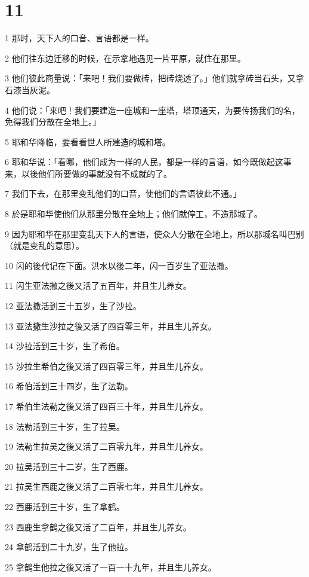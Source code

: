 \chapter{11}

\par 1 那时，天下人的口音、言语都是一样。
\par 2 他们往东边迁移的时候，在示拿地遇见一片平原，就住在那里。
\par 3 他们彼此商量说：「来吧！我们要做砖，把砖烧透了。」他们就拿砖当石头，又拿石漆当灰泥。
\par 4 他们说：「来吧！我们要建造一座城和一座塔，塔顶通天，为要传扬我们的名，免得我们分散在全地上。」
\par 5 耶和华降临，要看看世人所建造的城和塔。
\par 6 耶和华说：「看哪，他们成为一样的人民，都是一样的言语，如今既做起这事来，以後他们所要做的事就没有不成就的了。
\par 7 我们下去，在那里变乱他们的口音，使他们的言语彼此不通。」
\par 8 於是耶和华使他们从那里分散在全地上；他们就停工，不造那城了。
\par 9 因为耶和华在那里变乱天下人的言语，使众人分散在全地上，所以那城名叫巴别（就是变乱的意思）。
\par 10 闪的後代记在下面。洪水以後二年，闪一百岁生了亚法撒。
\par 11 闪生亚法撒之後又活了五百年，并且生儿养女。
\par 12 亚法撒活到三十五岁，生了沙拉。
\par 13 亚法撒生沙拉之後又活了四百零三年，并且生儿养女。
\par 14 沙拉活到三十岁，生了希伯。
\par 15 沙拉生希伯之後又活了四百零三年，并且生儿养女。
\par 16 希伯活到三十四岁，生了法勒。
\par 17 希伯生法勒之後又活了四百三十年，并且生儿养女。
\par 18 法勒活到三十岁，生了拉吴。
\par 19 法勒生拉吴之後又活了二百零九年，并且生儿养女。
\par 20 拉吴活到三十二岁，生了西鹿。
\par 21 拉吴生西鹿之後又活了二百零七年，并且生儿养女。
\par 22 西鹿活到三十岁，生了拿鹤。
\par 23 西鹿生拿鹤之後又活了二百年，并且生儿养女。
\par 24 拿鹤活到二十九岁，生了他拉。
\par 25 拿鹤生他拉之後又活了一百一十九年，并且生儿养女。
